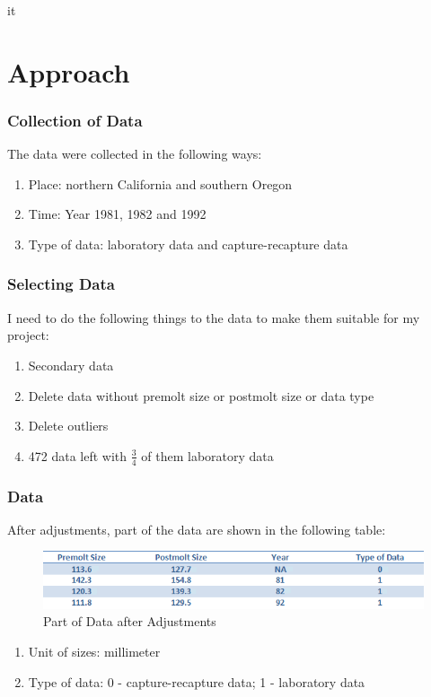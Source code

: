 it\documentclass[compress,handout,10pt]{beamer}
\let\olditem\item
\renewcommand{\item}{\setlength{\itemsep}{0.5\baselineskip}\olditem}
\begin{document}
\section{Approach}
\begin{frame}
    \frametitle{Collection of Data}
    The data were collected in the following ways:
     \begin{enumerate}
         \item Place: northern California and southern Oregon
         \item Time: Year 1981, 1982 and 1992
         \item Type of data: laboratory data and capture-recapture data
     \end{enumerate}
\end{frame}

\begin{frame}
    \frametitle{Selecting Data}
    I need to do the following things to the data to make them suitable for my project:
     \begin{enumerate}
         \item Secondary data
         \item Delete data without premolt size or postmolt size or data type
         \item Delete outliers
         \item 472 data left with $\frac{3}{4}$ of them laboratory data
     \end{enumerate}
\end{frame}

\begin{frame}
    \frametitle{Data}
    After adjustments, part of the data are shown in the following table:
    \begin{figure}
        \begin{center}
	    \includegraphics[width=\textwidth]{data.png}
	\end{center}
	\caption{Part of Data after Adjustments}
    \end{figure}
    \begin{enumerate}
        \item Unit of sizes: millimeter
	\item Type of data: 0 - capture-recapture data; 1 - laboratory data
    \end{enumerate}
\end{frame}
\end{document}

